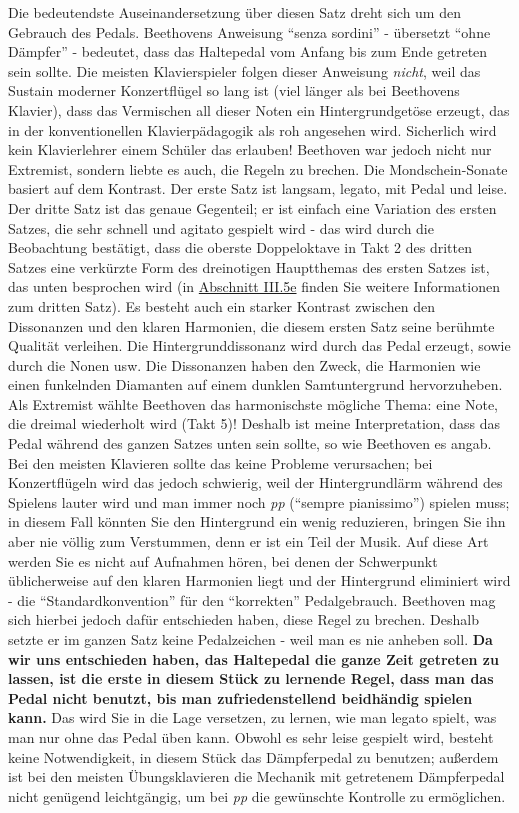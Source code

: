 Die bedeutendste Auseinandersetzung über diesen Satz dreht sich um den Gebrauch des Pedals.
Beethovens Anweisung \enquote{senza sordini} - übersetzt \enquote{ohne Dämpfer} - bedeutet, dass das Haltepedal vom Anfang bis zum Ende getreten sein sollte.
Die meisten Klavierspieler folgen dieser Anweisung \textit{nicht}, weil das Sustain moderner Konzertflügel so lang ist (viel länger als bei Beethovens Klavier), dass das Vermischen all dieser Noten ein Hintergrundgetöse erzeugt, das in der konventionellen Klavierpädagogik als roh angesehen wird.
Sicherlich wird kein Klavierlehrer einem Schüler das erlauben!
Beethoven war jedoch nicht nur Extremist, sondern liebte es auch, die Regeln zu brechen.
Die Mondschein-Sonate basiert auf dem Kontrast.
Der erste Satz ist langsam, legato, mit Pedal und leise.
Der dritte Satz ist das genaue Gegenteil; er ist einfach eine Variation des ersten Satzes, die sehr schnell und agitato gespielt wird - das wird durch die Beobachtung bestätigt, dass die oberste Doppeloktave in Takt 2 des dritten Satzes eine verkürzte Form des dreinotigen Hauptthemas des ersten Satzes ist, das unten besprochen wird (in \hyperlink{Arpeggios}{Abschnitt III.5e} finden Sie weitere Informationen zum dritten Satz).
Es besteht auch ein starker Kontrast zwischen den Dissonanzen und den klaren Harmonien, die diesem ersten Satz seine berühmte Qualität verleihen.
Die Hintergrunddissonanz wird durch das Pedal erzeugt, sowie durch die Nonen usw.
Die Dissonanzen haben den Zweck, die Harmonien wie einen funkelnden Diamanten auf einem dunklen Samtuntergrund hervorzuheben.
Als Extremist wählte Beethoven das harmonischste mögliche Thema: eine Note, die dreimal wiederholt wird (Takt 5)!
Deshalb ist meine Interpretation, dass das Pedal während des ganzen Satzes unten sein sollte, so wie Beethoven es angab.
Bei den meisten Klavieren sollte das keine Probleme verursachen;
bei Konzertflügeln wird das jedoch schwierig, weil der Hintergrundlärm während des Spielens lauter wird und man immer noch \textit{pp} (\enquote{sempre pianissimo}) spielen muss; in diesem Fall könnten Sie den Hintergrund ein wenig reduzieren, bringen Sie ihn aber nie völlig zum Verstummen, denn er ist ein Teil der Musik.
Auf diese Art werden Sie es nicht auf Aufnahmen hören, bei denen der Schwerpunkt üblicherweise auf den klaren Harmonien liegt und der Hintergrund eliminiert wird - die \enquote{Standardkonvention} für den \enquote{korrekten} Pedalgebrauch.
Beethoven mag sich hierbei jedoch dafür entschieden haben, diese Regel zu brechen.
Deshalb setzte er im ganzen Satz keine Pedalzeichen - weil man es nie anheben soll.
\textbf{Da wir uns entschieden haben, das Haltepedal die ganze Zeit getreten zu lassen, ist die erste in diesem Stück zu lernende Regel, dass man das Pedal nicht benutzt, bis man zufriedenstellend beidhändig spielen kann.}
Das wird Sie in die Lage versetzen, zu lernen, wie man legato spielt, was man nur ohne das Pedal üben kann.
Obwohl es sehr leise gespielt wird, besteht keine Notwendigkeit, in diesem Stück das Dämpferpedal zu benutzen; außerdem ist bei den meisten Übungsklavieren die Mechanik mit getretenem Dämpferpedal nicht genügend leichtgängig, um bei \textit{pp} die gewünschte Kontrolle zu ermöglichen.

